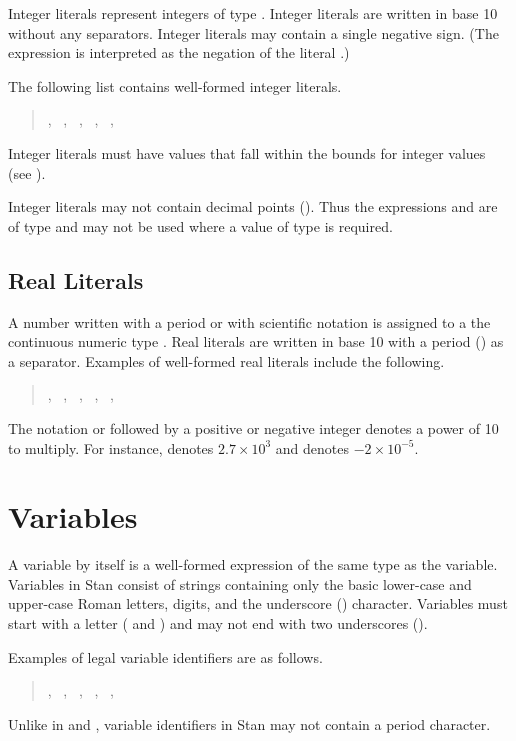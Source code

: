 Integer literals represent integers of type .  Integer
literals are written in base 10 without any separators.  Integer
literals may contain a single negative sign.  (The expression
 is interpreted as the negation of the literal .)

The following list contains well-formed integer literals.
%
\begin{quote}
, \ , \ , \ , 
\ , \ 
\end{quote}
%
Integer literals must have values that fall within the bounds for
integer values (see ).

Integer literals may not contain decimal points ().  Thus the
expressions  and  are of type  and may
not be used where a value of type  is required.

\subsection{Real Literals}

A number written with a period or with scientific notation is assigned
to a the continuous numeric type .  Real literals are
written in base 10 with a period () as a separator.  Examples
of well-formed real literals include the following.
%
\begin{quote}
, \ , \ , \ , \ 
, \ 
\end{quote}
%
The notation  or  followed by a positive or negative
integer denotes a power of 10 to multiply.  For instance, 
denotes $2.7 \times 10^3$ and \code{-2E-5} denotes $-2 \times
10^{-5}$.


\section{Variables}\label{variables.section}

A variable by itself is a well-formed expression of the same type as
the variable.  Variables in Stan consist of \ASCII strings containing
only the basic lower-case and upper-case Roman letters, digits, and
the underscore (\code{\_}) character.  Variables must start with a
letter (\code{a--z} and \code{A--Z}) and may not end with two underscores
(\code{\_\_}).

Examples of legal variable identifiers are as follows.
%
\begin{quote}
, 
\ , 
\ ,
\ , 
\ ,
\ 
\end{quote}
%
Unlike in \R and \BUGS, variable identifiers in Stan may not contain
a period character.  

